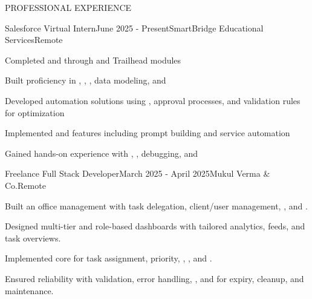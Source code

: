 \documentclass{resume}
\begin{document}
\begin{rSection}{PROFESSIONAL EXPERIENCE}

\begin{rExperience}{Salesforce Virtual Intern}{June 2025 - Present}{SmartBridge Educational Services}{Remote}
\item Completed  and  through  and Trailhead modules
\item Built proficiency in , , , data modeling, and 
\item Developed automation solutions using , approval processes, and validation rules for optimization
\item Implemented  and  features including prompt building and service automation
\item Gained hands-on experience with , , debugging, and 
\end{rExperience}

\begin{rExperience}{Freelance Full Stack Developer}{March 2025 - April 2025}{Mukul Verma \& Co.}{Remote}
\item Built an office management  with task delegation, client/user management, , and .
\item Designed multi-tier  and role-based dashboards with tailored analytics, feeds, and task overviews.
\item Implemented core  for task assignment, priority, , , and .
\item Ensured reliability with validation, error handling, , and  for expiry, cleanup, and maintenance.
\end{rExperience}

\end{rSection}
\end{document}
